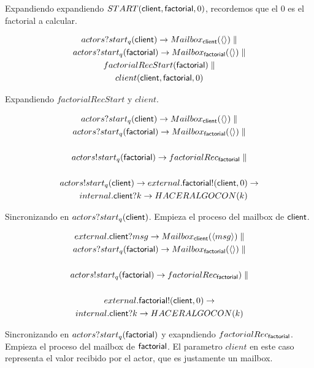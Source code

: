 \documentclass[fleqn]{article}
\newcommand{\myList}[1]{\langle #1 \rangle}
\begin{document}
Expandiendo expandiendo $START(\mathsf{client},\mathsf{factorial}, 0)$, recordemos que el 0 es el factorial a calcular.

\begin{gather*}
actors?start_q(\mbc) \rightarrow Mailbox_\mbc(\myList{}) \parallel \\
actors?start_q(\mbf) \rightarrow Mailbox_\mbf(\myList{}) \parallel \\
factorialRecStart(\mbf) \parallel \\
client(\mbc, \mbf, 0)
\end{gather*}

Expandiendo $factorialRecStart$ y $client$.

\begin{gather*}
actors?start_q(\mbc) \rightarrow Mailbox_\mbc(\myList{}) \parallel \\
actors?start_q(\mbf) \rightarrow Mailbox_\mbf(\myList{}) \parallel \\ \\
actors!start_q(\mbf) \rightarrow factorialRec_\mbf \parallel \\ \\
actors!start_q(\mbc) \rightarrow external.\mbf!(\mbc,0) \rightarrow \\ 
\quad internal.\mbc?k \rightarrow HACERALGOCON(k)
\end{gather*}

Sincronizando en $actors?start_q(\mathsf{client})$. Empieza el proceso del mailbox de $\mathsf{client}$.

\begin{gather*}
external.\mbc?msg \rightarrow Mailbox_\mbc(\myList{msg})  \parallel \\
actors?start_q(\mbf) \rightarrow Mailbox_\mbf(\myList{}) \parallel \\ \\
actors!start_q(\mbf) \rightarrow factorialRec_\mbf ) \parallel \\ \\
external.\mbf!(\mbc,0) \rightarrow \\
internal.\mbc?k \rightarrow HACERALGOCON(k) 
\end{gather*}

Sincronizando en $actors?start_q(\mathsf{factorial})$ y exapndiendo $factorialRec_{\mathsf{factorial}}$.
Empieza el proceso del mailbox de $\mathsf{factorial}$. El parametro $client$ en este caso representa el
valor recibido por el actor, que es justamente un mailbox.
\end{document}

